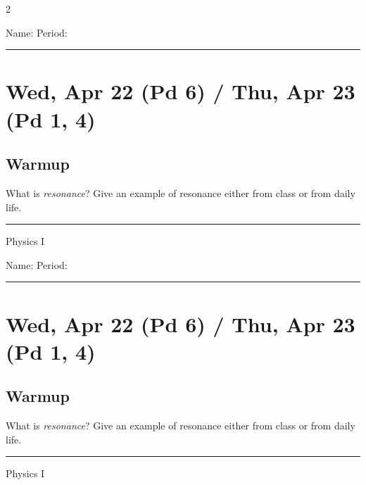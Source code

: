 \documentclass[10pt,landscape]{exam}
\def\todayDate{Wed, Apr 22 (Pd 6) / Thu, Apr 23 (Pd 1, 4)}
\def\content{
\begin{questions}
  \question What is \emph{resonance}? \vs 
  \question Give an example of resonance either from class or from daily life. \vs
\end{questions}
}
\begin{document}
\pagestyle{empty}

\setlength{\columnsep}{0.8in}
\begin{multicols*}{2}

\noindent  
Name: \hfill Period: \hspace{5em}
\vspace{0.5em}
\hrule

\section*{\todayDate}
\subsection*{Warmup}

\content

\vfill
\hrule
\vspace{0.5em}
\hfill {\sc Physics I}

\columnbreak

\noindent  
Name: \hfill Period: \hspace{5em}
\vspace{0.5em}
\hrule

\section*{\todayDate}
\subsection*{Warmup}

\content

\vfill
\hrule
\vspace{0.5em}
\hfill {\sc Physics I}

\end{multicols*}
\end{document}

